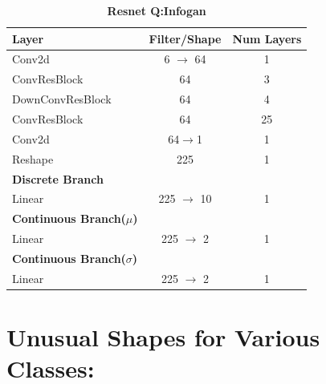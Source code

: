 \documentclass[10pt,twocolumn,letterpaper]{article}
\begin{document}
\begin{table}[ht]
\caption{\textbf{Resnet Q:Infogan}}
\centering %
\begin{tabular}{l c c} %
\toprule%
\textbf{Layer} & \textbf{Filter/Shape} & \textbf{Num Layers} \\
\midrule
Conv2d & 6 $\rightarrow$ 64 & 1\\
\hdashline%
ConvResBlock & 64 & 3\\
DownConvResBlock & 64 & 4\\
ConvResBlock & 64 & 25\\
\hdashline
Conv2d & 64$\rightarrow$1 & 1 \\
Reshape & 225 & 1 \\
\midrule
\textbf{Discrete Branch} \\
\midrule
Linear & 225 $\rightarrow$ 10 & 1 \\
\midrule
\textbf{Continuous Branch($\mu$)} \\
\midrule
Linear & 225 $\rightarrow$ 2 & 1 \\
\midrule
\textbf{Continuous Branch($\sigma$)} \\
\midrule
Linear & 225 $\rightarrow$ 2 & 1 \\
\bottomrule%
\end{tabular}
\label{table:resnet_q_infogan} %
\end{table}


\section{Unusual Shapes for Various Classes:}
\end{document}
